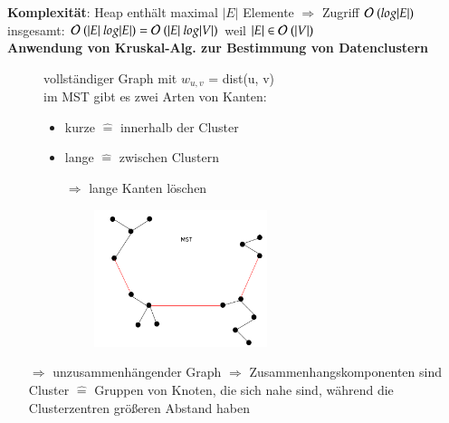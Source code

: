     \textbf{Komplexität}: Heap enthält maximal $|E|$ Elemente $\Rightarrow$ Zugriff $\mathcal{O}{}\ (log|E|)$\\
    insgesamt: $\bigO{}\ (|E|\ log|E|) = \bigO{}\ (|E| \ log |V|)$ weil $|E| \in \bigO{}\ (|V|)$\\

    \textbf{Anwendung von Kruskal-Alg. zur Bestimmung von Datenclustern}\\
    \begin{figure}[htbp]
        \begin{minipage}{8cm}
            \vspace*{0mm}
            vollständiger Graph mit $w_{u,v}$ = dist(u, v)\\

            im MST gibt es zwei Arten von Kanten:
            \begin{itemize}
                \item kurze $\widehat{=}$ innerhalb der Cluster
                \item lange $\widehat{=}$ zwischen Clustern
                \item[$\Rightarrow$] lange Kanten löschen
            \end{itemize}
        \end{minipage}
        \begin{minipage}{8cm}
            \includegraphics[width=8cm,height=4cm,keepaspectratio]{./Pictures/Sternbild.png}
        \end{minipage}
    \end{figure}
    \begin{itemize}
        \item[$\Rightarrow$] unzusammenhängender Graph $\Rightarrow$ Zusammenhangskomponenten sind Cluster $\widehat{=}$ Gruppen von Knoten, die sich nahe sind, während die Clusterzentren größeren Abstand haben
    \end{itemize}


